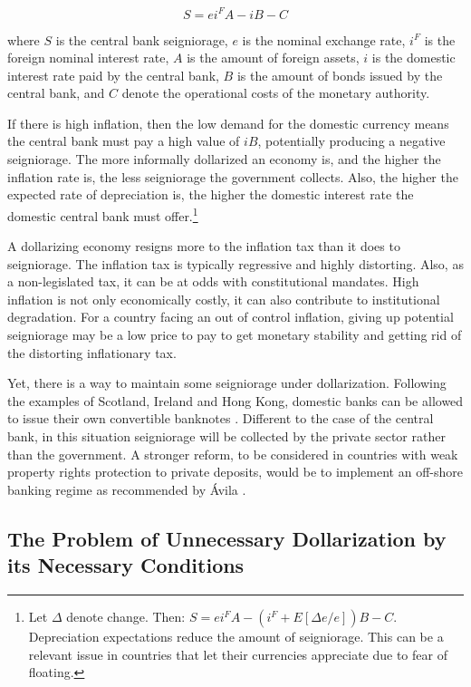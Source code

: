 \documentclass[12pt]{article}
\begin{document}
\begin{equation}\label{Eq:2}
    S = ei^FA - iB - C
\end{equation}

where $S$ is the central bank seigniorage, $e$ is the nominal exchange rate, $i^F$ is the foreign nominal interest rate, $A$ is the amount of foreign assets, $i$ is the domestic interest rate paid by the central bank, $B$ is the amount of bonds issued by the central bank, and $C$ denote the operational costs of the monetary authority.

If there is high inflation, then the low demand for the domestic currency means the central bank must pay a high value of $iB$, potentially producing a negative seigniorage. The more informally dollarized an economy is, and the higher the inflation rate is, the less seigniorage the government collects. Also, the higher the expected rate of depreciation is, the higher the domestic interest rate the domestic central bank must offer.\footnote{Let $\Delta$ denote change. Then: $S = ei^FA - (i^F + E[\Delta e / e])B - C$. Depreciation expectations reduce the amount of seigniorage. This can be a relevant issue in countries that let their currencies appreciate due to fear of floating.}

A dollarizing economy resigns more to the inflation tax than it does to seigniorage. The inflation tax is typically regressive and highly distorting. Also, as a non-legislated tax, it can be at odds with constitutional mandates. High inflation is not only economically costly, it can also contribute to institutional degradation. For a country facing an out of control inflation, giving up potential seigniorage may be a low price to pay to get monetary stability and getting rid of the distorting inflationary tax.

Yet, there is a way to maintain some seigniorage under dollarization. Following the examples of Scotland, Ireland and Hong Kong, domestic banks can be allowed to issue their own convertible banknotes \parencite[see][]{Hogan2012}. Different to the case of the central bank, in this situation seigniorage will be collected by the private sector rather than the government. A stronger reform, to be considered in countries with weak property rights protection to private deposits, would be to implement an off-shore banking regime as recommended by Ávila  \parencite*{Avila2019}.

\subsection{The Problem of Unnecessary Dollarization by its Necessary Conditions}
\end{document}

